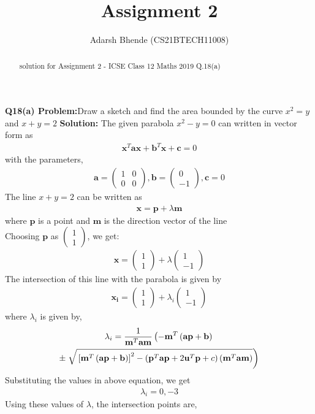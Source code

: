\documentclass[journal,12pt,twocolumn]{IEEEtran}
\title{Assignment 2}
\author{ Adarsh Bhende (CS21BTECH11008)}
\providecommand{\sbrak}[1]{\ensuremath{{}\left[#1\right]}}
\providecommand{\brak}[1]{\ensuremath{\left(#1\right)}}
\providecommand{\lbrak}[1]{\ensuremath{\left(#1\right.}}
\providecommand{\rbrak}[1]{\ensuremath{\left.#1\right)}}
\theoremstyle{remark}
\newcommand{\myvec}[1]{\ensuremath{\begin{pmatrix}#1\end{pmatrix}}}
\let\vec\mathbf
\begin{document}
\maketitle
\begin{abstract}
 solution for Assignment 2 - ICSE Class 12 Maths 2019 Q.18(a)
\end{abstract}
\textbf{Q18(a) Problem:}Draw a sketch and find the area bounded by the curve $x^2 = y$ and $x + y = 2$
\textbf{Solution: } The given parabola $x^2 - y = 0$ can written in vector form as
\begin{align}
    \vec{x}^T\vec{a}\vec{x} + \vec{b}^T\vec{x} + \vec{c} = 0
\end{align}
with the parameters,
\begin{align}
    \vec{a} = \myvec{1 & 0 \\ 0 & 0}, \vec{b} = \myvec{0 \\ -1}, \vec{c} = 0
\end{align}
The line $x + y = 2$ can be written as
\begin{align}
    \vec{x} = \vec{p} + \lambda \vec{m}
\end{align}
where $\vec{p}$ is a point and $\vec{m}$ is the direction vector of the line\\
Choosing $\vec{p}$ as $\myvec{1 \\ 1}$, we get:
\begin{align}
    \vec{x} = \myvec{1 \\ 1} + \lambda \myvec{1 \\ -1}
\end{align}
The intersection of this line with the parabola is given by
\begin{align}
    \vec{x_i} = \myvec{1 \\ 1} + \lambda_i \myvec{1 \\ -1}
\end{align}
where $\lambda_i$ is given by,
\begin{multline}
\footnotesize
    \lambda_i = \frac{1}
{
\vec{m}^T\vec{a}\vec{m}
}
\lbrak{-\vec{m}^T\brak{\vec{a}\vec{p}+\vec{b}}}
\\
\pm
\rbrak{\sqrt{\sbrak{\vec{m}^T\brak{\vec{a}\vec{p}+\vec{b}}
}^2
-
\brak
{
\vec{p}^T\vec{a}\vec{p} + 2\vec{u}^T\vec{p} +c
}
\brak{\vec{m}^T\vec{a}\vec{m}}
}
}
\label{eq:tangent_roots}
\end{multline}
Substituting the values in above equation, we get
\begin{align}
    \lambda_i = 0, -3
\end{align}
Using these values of $\lambda$, the intersection points are,
\end{document}
